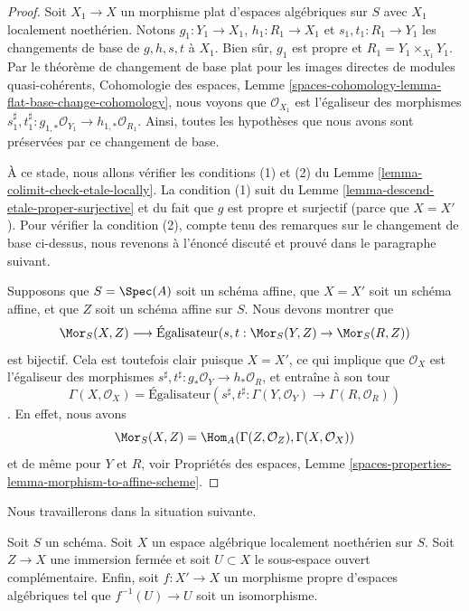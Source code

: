 \begin{proof}
\medskip\noindent
Soit $X_1 \to X$ un morphisme plat d'espaces algébriques sur $S$ avec $X_1$ localement noethérien. Notons $g_1 : Y_1 \to X_1$, $h_1 : R_1 \to X_1$ et $s_1, t_1 : R_1 \to Y_1$ les changements de base de $g, h, s, t$ à $X_1$.
Bien sûr, $g_1$ est propre et $R_1 = Y_1 \times_{X_1} Y_1$.
Par le théorème de changement de base plat pour les images directes de modules quasi-cohérents, Cohomologie des espaces, Lemme \ref{spaces-cohomology-lemma-flat-base-change-cohomology}, nous voyons que $\mathcal{O}_{X_1}$ est l'égaliseur des morphismes $s_1^\sharp, t_1^\sharp : g_{1, *}\mathcal{O}_{Y_1} \to
h_{1, *}\mathcal{O}_{R_1}$. Ainsi, toutes les hypothèses que nous avons sont préservées par ce changement de base.

\medskip\noindent
À ce stade, nous allons vérifier les conditions (1) et (2) du
Lemme \ref{lemma-colimit-check-etale-locally}. La condition (1)
suit du Lemme \ref{lemma-descend-etale-proper-surjective}
et du fait que $g$ est propre et surjectif (parce que $X = X'$).
Pour vérifier la condition (2), compte tenu des remarques sur le changement de base ci-dessus,
nous revenons à l'énoncé discuté et prouvé dans le paragraphe suivant.

\medskip\noindent
Supposons que $S = \Spec(A)$ soit un schéma affine, que $X = X'$ soit un schéma affine, et que $Z$ soit un schéma affine sur $S$. Nous devons montrer que $$
\Mor_S(X, Z) \longrightarrow
\text{Égalisateur}(s, t : \Mor_S(Y, Z) \to \Mor_S(R, Z))
$$
est bijectif. Cela est toutefois clair puisque $X = X'$, ce qui implique que $\mathcal{O}_X$ est l'égaliseur des morphismes $s^\sharp, t^\sharp : g_*\mathcal{O}_Y \to h_*\mathcal{O}_R$, et entraîne à son tour $$
\Gamma(X, \mathcal{O}_X) =
\text{Égalisateur}\left(
s^\sharp, t^\sharp : \Gamma(Y, \mathcal{O}_Y) \to
\Gamma(R, \mathcal{O}_R)
\right)
$$. En effet, nous avons $$
\Mor_S(X, Z) = \Hom_A(\Gamma(Z, \mathcal{O}_Z), \Gamma(X, \mathcal{O}_X))
$$ et de même pour $Y$ et $R$, voir Propriétés des espaces, Lemme \ref{spaces-properties-lemma-morphism-to-affine-scheme}. 
\end{proof}

\noindent
Nous travaillerons dans la situation suivante.

\begin{situation}
\label{situation-coequalizer-glue}
Soit $S$ un schéma. Soit $X$ un espace algébrique localement noethérien sur $S$.
Soit $Z \to X$ une immersion fermée et soit $U \subset X$ le sous-espace ouvert complémentaire. Enfin, soit $f : X' \to X$ un morphisme propre d'espaces algébriques tel que $f^{-1}(U) \to U$ soit un isomorphisme.
\end{situation}

